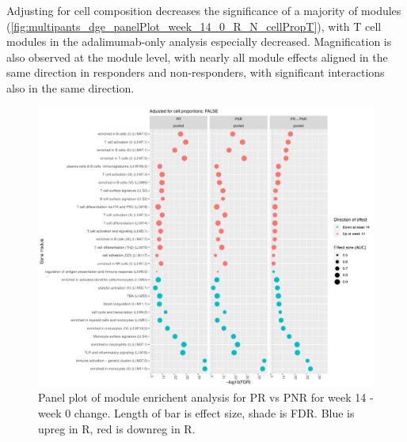 \begin{outline}
Adjusting for cell composition decreases the significance of a majority of modules (\autoref{fig:multipants_dge_panelPlot_week_14_0_R_N_cellPropT}),
with T cell modules in the adalimumab-only analysis especially decreased.
Magnification is also observed at the module level, with nearly all module effects aligned in the same direction in responders and non-responders, with significant interactions also in the same direction.

\begin{figure}
    \centering
    \includegraphics[width=1.0\textwidth,page=1]{mainmatter/figures/chapter_04/plot_gene_set_enrichment.tmodCERNO_panelplot_reversed_C_3R_1R,C_3N_1N,C_(3R_1R)_(3N_1N).cell_prop_correction_FALSE.pdf}
    \caption{Panel plot of module enrichent analysis for PR vs PNR for week 14 - week 0 change. Length of bar is effect size, shade is FDR. Blue is upreg in R, red is downreg in R.}
    \label{fig:multipants_dge_panelPlot_week_14_0_R_N_cellPropF}
\end{figure}


\end{outline}
